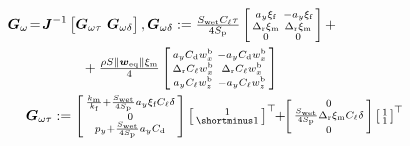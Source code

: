 \begin{algorithm}
\begin{algorithmic} [1]
        \begin{align}
        \nonumber
            \boldsymbol{G}_{\omega} \! &= \!  \boldsymbol{J}^{-1} \begin{bmatrix}\boldsymbol{G}_{\omega \tau} \!\! & \!\! \boldsymbol{G}_{\omega \delta} 
            \end{bmatrix}, 
            \boldsymbol{G}_{\omega \delta} :=
            \tfrac{S_{\text{wet}}C_{\ell}\tau}{4S_{\text{p}}} 
            \smallmat{ a_{y} \xi_{\text{f}} & - a_{y} \xi_{\text{f}}\\
                        \Delta_{\text{r}}\xi_{\text{m}} & \Delta_{\text{r}}\xi_{\text{m}}\\
                        0 & 0} + 
            \\
        \label{eq:Gomega_ALG_Luca}
            &\qquad \qquad +  \tfrac{\rho S \lVert \boldsymbol{w}_{\mathrm{eq}} \rVert\xi_{\text{m}}}{4}
            \smallmat{ a_{y} C_{\text{d}} w^{\text{b}}_{x} & -  a_{y} C_{\text{d}} w^{\text{b}}_{x} \\
            \Delta_{\text{r}} C_{\ell} w^{\text{b}}_{x} & \Delta_{\text{r}} C_{\ell} w^{\text{b}}_{x} \\
            a_{y} C_{\ell} w^{\text{b}}_{z} & - a_{y} C_{\ell} w^{\text{b}}_{z} 
            }  \\
        \nonumber
        & \boldsymbol{G}_{\omega \tau} := \smallmat{ \frac{k_{\text{m}}}{k_{\text{f}}} + \frac{S_{\text{wet}}}{4S_{\text{p}}}  a_{y} \xi_{\text{f}} C_{\ell} \delta \\
            0 \\ p_{y}+ \frac{S_{\text{wet}}}{4S_{\text{p}}}  a_{y} C_{\text{d}} }
            \smallmat{ 1 \\ \shortminus  1}^\top 
            \!\! + \!\! 
            \smallmat{ 0 \\ \frac{S_{\text{wet}}}{4S_{\text{p}}} 
            \Delta_{\text{r}} \xi_{\text{m}} C_{\ell}\delta
            \\ 0} \smallmat{ 1 \\ 1}^\top 
        \end{align}
        

\end{algorithmic}
\end{algorithm}
